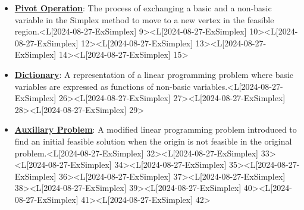 \documentclass{article}%
\begin{document}
\begin{itemize}[[leftmargin=*]]
\item \href{https://www.math.purdue.edu/~yipn/421/2024-08-27-ExSimplex.pdf#page=9}{\textbf{Pivot Operation}}: The process of exchanging a basic and a non-basic variable in the Simplex method to move to a new vertex in the feasible region.<L[2024-08-27-ExSimplex] 9><L[2024-08-27-ExSimplex] 10><L[2024-08-27-ExSimplex] 12><L[2024-08-27-ExSimplex] 13><L[2024-08-27-ExSimplex] 14><L[2024-08-27-ExSimplex] 15>%
\item \href{https://www.math.purdue.edu/~yipn/421/2024-08-27-ExSimplex.pdf#page=26}{\textbf{Dictionary}}: A representation of a linear programming problem where basic variables are expressed as functions of non-basic variables.<L[2024-08-27-ExSimplex] 26><L[2024-08-27-ExSimplex] 27><L[2024-08-27-ExSimplex] 28><L[2024-08-27-ExSimplex] 29>%
\item \href{https://www.math.purdue.edu/~yipn/421/2024-08-27-ExSimplex.pdf#page=32}{\textbf{Auxiliary Problem}}: A modified linear programming problem introduced to find an initial feasible solution when the origin is not feasible in the original problem.<L[2024-08-27-ExSimplex] 32><L[2024-08-27-ExSimplex] 33><L[2024-08-27-ExSimplex] 34><L[2024-08-27-ExSimplex] 35><L[2024-08-27-ExSimplex] 36><L[2024-08-27-ExSimplex] 37><L[2024-08-27-ExSimplex] 38><L[2024-08-27-ExSimplex] 39><L[2024-08-27-ExSimplex] 40><L[2024-08-27-ExSimplex] 41><L[2024-08-27-ExSimplex] 42>%
\end{itemize}%
\newpage

%
\end{document}
